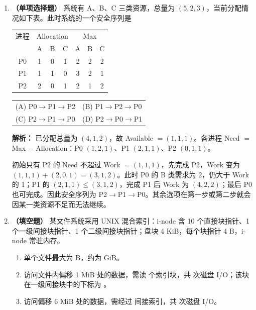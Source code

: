 \begin{enumerate}
虚拟地址低 13 位为页内偏移：$\texttt{0x1A2B3}\bmod 2^{13}=\texttt{0x2B3}$；虚页号为 $\texttt{0x1A2B3}\gg 13=\texttt{0xD}$。物理地址 $=\texttt{0x1F2C5}\times 2^{13}+\texttt{0x2B3}=\texttt{0x3E58A000}+\texttt{0x2B3}=\texttt{0x3E58A2B3}$。TLB 未命中时先读一次页表项，再访问一次数据；Cache 命中不额外访问主存，故共 2 次。\par\noindent{}\else \answerarea[6] \fi

\item \textbf{（单项选择题）} 系统有 A、B、C 三类资源，总量为 $(5,2,3)$，当前分配情况如下表。此时系统的一个安全序列是
\begin{center}
\small
\begin{tabular}{|c|ccc|ccc|}
\hline
进程 & \multicolumn{3}{c|}{Allocation} & \multicolumn{3}{c|}{Max} \\
 & A & B & C & A & B & C \\
\hline
P0 & 1 & 0 & 1 & 2 & 2 & 2 \\
P1 & 1 & 1 & 0 & 3 & 2 & 1 \\
P2 & 2 & 0 & 1 & 2 & 1 & 2 \\
\hline
\end{tabular}
\end{center}
\begin{center}
\begin{tabular}{ll}
(A) P0$\to$P1$\to$P2 & (B) P1$\to$P2$\to$P0 \\[4pt]
(C) P2$\to$P1$\to$P0 & (D) P2$\to$P0$\to$P1
\end{tabular}
\end{center}

\ifshowsolutions\par\noindent\textbf{解析：} 已分配总量为 $(4,1,2)$，故 Available $=(1,1,1)$。各进程 Need $=$ Max $-$ Allocation：P0 $(1,2,1)$、P1 $(2,1,1)$、P2 $(0,1,1)$。

初始只有 P2 的 Need 不超过 Work $=(1,1,1)$，先完成 P2，Work 变为 $(1,1,1)+(2,0,1)=(3,1,2)$。此时 P0 的 B 类需求为 2，仍大于 Work 的 1；P1 的 $(2,1,1)\leqslant(3,1,2)$，完成 P1 后 Work 为 $(4,2,2)$；最后 P0 也可完成。因此安全序列为 P2$\to$P1$\to$P0。其余选项在第一步或第二步就会因某一类资源不足而无法继续。\else \answerarea \fi

\item \textbf{（填空题）} 某文件系统采用 UNIX 混合索引：i-node 含 10 个直接块指针、1 个一级间接块指针、1 个二级间接块指针；盘块 4 KiB，每个块指针 4 B，i-node 常驻内存。
\begin{enumerate}
\item[(1)] 单个文件最大为 \underline{\qquad} B，约为 \underline{\qquad} GiB。
\item[(2)] 访问文件内偏移 1 MiB 处的数据，需读 \underline{\qquad} 个索引块，共 \underline{\qquad} 次磁盘 I/O；该块在一级间接块中的下标为 \underline{\qquad}。
\item[(3)] 访问偏移 6 MiB 处的数据，需经过 \underline{\qquad} 间接索引，共 \underline{\qquad} 次磁盘 I/O。
\end{enumerate}


\end{enumerate}
